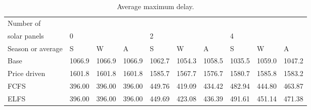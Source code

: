 \begin{table}[h]
\centering
\begin{tabular}{l|lll|lll|lll}Number of \\ solar panels&0& & &2& & &4& & \\ \hline
Season or average & S & W & A & S & W & A & S & W & A \\ \hline
Base&1066.9&1066.9&1066.9&1062.7&1054.3&1058.5&1035.5&1059.0&1047.2 \\
Price driven&1601.8&1601.8&1601.8&1585.7&1567.7&1576.7&1580.7&1585.8&1583.2 \\
FCFS&396.00&396.00&396.00&449.76&419.09&434.42&482.94&444.80&463.87 \\
ELFS&396.00&396.00&396.00&449.69&423.08&436.39&491.61&451.14&471.38 \\
\end{tabular}
\caption{Average maximum delay.}
\label{avg max delay}
\end{table}
